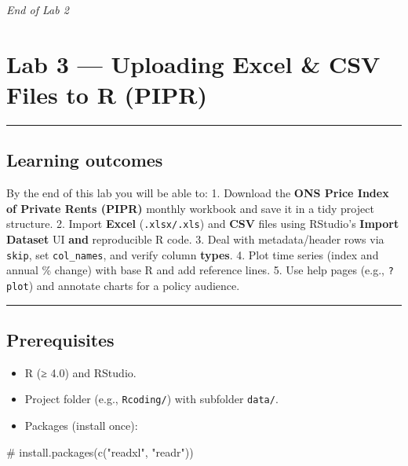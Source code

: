 \documentclass[
  letterpaper,
  DIV=11,
  numbers=noendperiod]{scrreprt}
\newenvironment{Shaded}{\begin{snugshade}}{\end{snugshade}}
\newcommand{\CommentTok}[1]{\textcolor[rgb]{0.37,0.37,0.37}{#1}}
\providecommand{\tightlist}{%
  \setlength{\itemsep}{0pt}\setlength{\parskip}{0pt}}
\begin{document}
\emph{End of Lab 2}


\chapter{Lab 3 --- Uploading Excel \& CSV Files to R
(PIPR)}\label{lab-3-uploading-excel-csv-files-to-r-pipr}

\begin{center}\rule{0.5\linewidth}{0.5pt}\end{center}

\section{Learning outcomes}\label{learning-outcomes-2}

By the end of this lab you will be able to: 1. Download the \textbf{ONS
Price Index of Private Rents (PIPR)} monthly workbook and save it in a
tidy project structure. 2. Import \textbf{Excel} (\texttt{.xlsx/.xls})
and \textbf{CSV} files using RStudio's \textbf{Import Dataset} UI
\textbf{and} reproducible R code. 3. Deal with metadata/header rows via
\texttt{skip}, set \texttt{col\_names}, and verify column
\textbf{types}. 4. Plot time series (index and annual \% change) with
base R and add reference lines. 5. Use help pages (e.g., \texttt{?plot})
and annotate charts for a policy audience.

\begin{center}\rule{0.5\linewidth}{0.5pt}\end{center}

\section{Prerequisites}\label{prerequisites-2}

\begin{itemize}
\tightlist
\item
  R (≥ 4.0) and RStudio.
\item
  Project folder (e.g., \texttt{Rcoding/}) with subfolder
  \texttt{data/}.
\item
  Packages (install once):
\end{itemize}

\begin{Shaded}
\begin{Highlighting}[]
\CommentTok{\# install.packages(c("readxl", "readr"))}
\end{Highlighting}
\end{Shaded}
\end{document}
